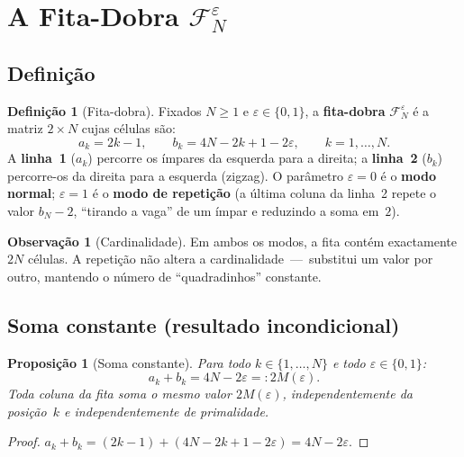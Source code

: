 \documentclass[12pt, a4paper]{article}
\theoremstyle{plain}
\newtheorem{proposition}[theorem]{Proposição}
\theoremstyle{definition}
\newtheorem{definition}[theorem]{Definição}
\newtheorem{remark}[theorem]{Observação}
\theoremstyle{remark}
\begin{document}
	\section{A Fita-Dobra $\mathcal{F}_N^\varepsilon$}
	\label{sec:fita}
	
	\subsection{Definição}
	
	\begin{definition}[Fita-dobra]
		\label{def:fita}
		Fixados $N\geq1$ e $\varepsilon\in\{0,1\}$, a
		\textbf{fita-dobra} $\mathcal{F}_N^\varepsilon$ é a matriz
		$2\times N$ cujas células são:
		\[
		a_k = 2k-1,
		\qquad
		b_k = 4N - 2k + 1 - 2\varepsilon,
		\qquad k=1,\dots,N.
		\]
		A \textbf{linha~1} ($a_k$) percorre os ímpares da esquerda para a
		direita; a \textbf{linha~2} ($b_k$) percorre-os da direita para a
		esquerda (zigzag).  O parâmetro $\varepsilon=0$ é o
		\textbf{modo normal}; $\varepsilon=1$ é o \textbf{modo de
			repetição} (a última coluna da linha~2 repete o valor $b_N-2$,
		``tirando a vaga'' de um ímpar e reduzindo a soma em~$2$).
	\end{definition}
	
	\begin{remark}[Cardinalidade]
		Em ambos os modos, a fita contém exactamente $2N$ células.
		A repetição não altera a cardinalidade~---~substitui um valor por
		outro, mantendo o número de ``quadradinhos'' constante.
	\end{remark}
	
	\subsection{Soma constante (resultado incondicional)}
	
	\begin{proposition}[Soma constante]
		\label{prop:soma}
		Para todo $k\in\{1,\dots,N\}$ e todo $\varepsilon\in\{0,1\}$:
		\[
		a_k + b_k = 4N - 2\varepsilon =: 2M(\varepsilon).
		\]
		Toda coluna da fita soma o mesmo valor $2M(\varepsilon)$,
		independentemente da posição~$k$ e independentemente de
		primalidade.
	\end{proposition}
	
	\begin{proof}
		$a_k+b_k = (2k-1)+(4N-2k+1-2\varepsilon) = 4N-2\varepsilon$.
	\end{proof}
	
\end{document}
